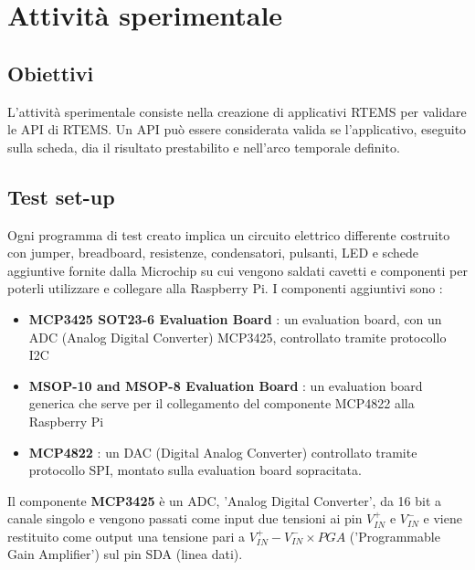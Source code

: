 \documentclass[12pt, a4paper, titlepage, oneside]{book}
\begin{document}
\chapter{Attività sperimentale}
\section{Obiettivi}
L'attività sperimentale consiste nella creazione di applicativi RTEMS per validare le API di RTEMS. Un API può essere considerata valida se l'applicativo, eseguito sulla scheda, dia il risultato prestabilito e nell'arco temporale definito.\newline
\section{Test set-up}
Ogni programma di test creato implica un circuito elettrico differente costruito con jumper, breadboard, resistenze, condensatori, pulsanti, LED e schede aggiuntive fornite dalla Microchip su cui vengono saldati cavetti e componenti per poterli utilizzare e collegare alla Raspberry Pi.\newline
I componenti aggiuntivi sono :
\begin{itemize}
    \item\parbox[t]{\linewidth}{ \textbf{MCP3425 SOT23-6 Evaluation Board}  \cite{microchipMCP3425}: un evaluation board, con un ADC (Analog Digital Converter) MCP3425, controllato tramite protocollo I2C}
    \item\parbox[t]{\linewidth}{\textbf{MSOP-10 and MSOP-8 Evaluation Board} \cite{microchipMSOP10-8}: un evaluation board generica che serve per il collegamento del componente MCP4822 alla Raspberry Pi}
    \item\parbox[t]{\linewidth}{\textbf{ MCP4822} \cite{microchipMCP4822}: un DAC (Digital Analog Converter) controllato tramite protocollo SPI, montato sulla evaluation board sopracitata.}
\end{itemize}
\newpage
Il componente \textbf{MCP3425} è un ADC, 'Analog Digital Converter', da 16 bit a canale singolo e vengono passati come input due tensioni ai pin $V_{IN}^+ $ e $ V_{IN}^-$ e viene restituito come output una tensione pari a $V_{IN}^+ - V_{IN}^- \times PGA$ ('Programmable Gain Amplifier') sul pin SDA (linea dati).\newline 
\end{document}
